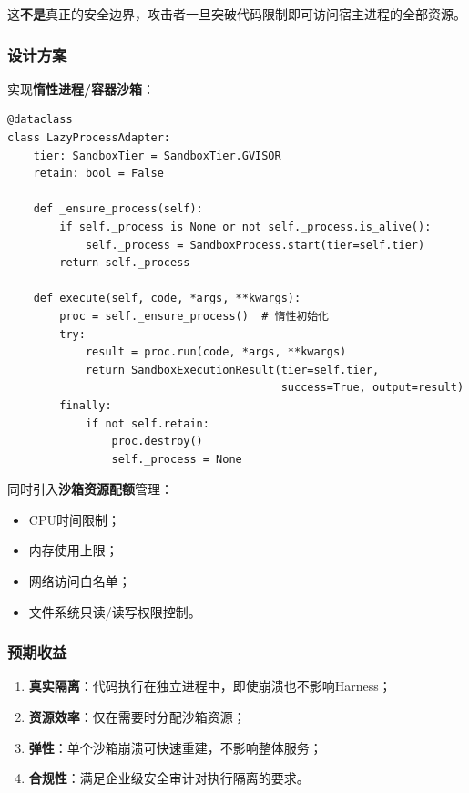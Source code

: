 \documentclass[12pt,a4paper]{ctexart}
\begin{document}
这\textbf{不是}真正的安全边界，攻击者一旦突破代码限制即可访问宿主进程的全部资源。

\subsubsection{设计方案}

实现\textbf{惰性进程/容器沙箱}：

\begin{lstlisting}[caption={惰性进程沙箱适配器}]
@dataclass
class LazyProcessAdapter:
    tier: SandboxTier = SandboxTier.GVISOR
    retain: bool = False

    def _ensure_process(self):
        if self._process is None or not self._process.is_alive():
            self._process = SandboxProcess.start(tier=self.tier)
        return self._process

    def execute(self, code, *args, **kwargs):
        proc = self._ensure_process()  # 惰性初始化
        try:
            result = proc.run(code, *args, **kwargs)
            return SandboxExecutionResult(tier=self.tier,
                                          success=True, output=result)
        finally:
            if not self.retain:
                proc.destroy()
                self._process = None
\end{lstlisting}

同时引入\textbf{沙箱资源配额}管理：
\begin{itemize}
    \item CPU时间限制；
    \item 内存使用上限；
    \item 网络访问白名单；
    \item 文件系统只读/读写权限控制。
\end{itemize}

\subsubsection{预期收益}

\begin{enumerate}
    \item \textbf{真实隔离}：代码执行在独立进程中，即使崩溃也不影响Harness；
    \item \textbf{资源效率}：仅在需要时分配沙箱资源；
    \item \textbf{弹性}：单个沙箱崩溃可快速重建，不影响整体服务；
    \item \textbf{合规性}：满足企业级安全审计对执行隔离的要求。
\end{enumerate}
\end{document}
